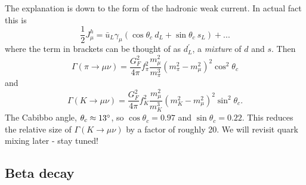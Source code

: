 \documentclass[a4paper,12pt]{article}
\begin{document}
The explanation is down to the form of the hadronic weak current. In actual fact this is
\begin{equation}
 \frac{1}{2}J_\mu^h = \bar{u}_L\gamma_\mu(\cos\theta_c\ d_L + \sin\theta_c\ s_L) + ... 
\end{equation}
where the term in brackets can be thought of as $d_L^\prime$, a \textit{mixture} of $d$ and $s$. Then 
\begin{equation}
    \Gamma(\pi \to \mu\nu) = \frac{G_F^2}{4\pi} f_\pi^2 \frac{m_\mu^2}{m_\pi^3}(m_\pi^2 - m_\mu^2)^2 \cos^2\theta_c
\end{equation} 
and
\begin{equation}
    \Gamma(K \to \mu\nu) = \frac{G_F^2}{4\pi} f_K^2 \frac{m_\mu^2}{m_K^3}(m_K^2 - m_\mu^2)^2 \sin^2\theta_c.
\end{equation} 
The Cabibbo angle, $\theta_c \approx 13\degree$, so $\cos\theta_c = 0.97$ and $\sin\theta_c = 0.22$. This reduces the relative size of $\Gamma(K \to \mu\nu)$ by a factor of roughly 20. We will revisit quark mixing later - stay tuned!
%
\subsection{Beta decay}
\end{document}
